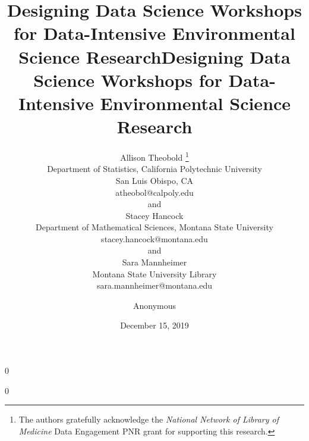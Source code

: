 \documentclass[12pt]{article}
\date{December 15, 2019}
\newcommand{\blind}{0}
\begin{document}
\def\spacingset#1{\renewcommand{\baselinestretch}%
{#1}\small\normalsize} \spacingset{1}



\blind
{
  \title{\bf Designing Data Science Workshops for Data-Intensive Environmental 
  Science Research}
  \author{Allison Theobold \thanks{The authors gratefully acknowledge the 
  \textit{National Network of Library of Medicine}
    Data Engagement PNR grant for supporting this research.} \hspace{.2cm}\\
    Department of Statistics, California Polytechnic University \\
    San Luis Obispo, CA \\
    atheobol@calpoly.edu \\
    and \\
    Stacey Hancock \\
    Department of Mathematical Sciences, Montana State University \\
    stacey.hancock@montana.edu \\
    and \\
    Sara Mannheimer \\
    Montana State University Library \\
    sara.mannheimer@montana.edu
    }
  \maketitle 
} \fi

\blind
{
  \title{\bf Designing Data Science Workshops for Data-Intensive Environmental
  Science Research}
  \author{Anonymous}
  \date{}
  \maketitle
} \fi

\bigskip
\end{document}
